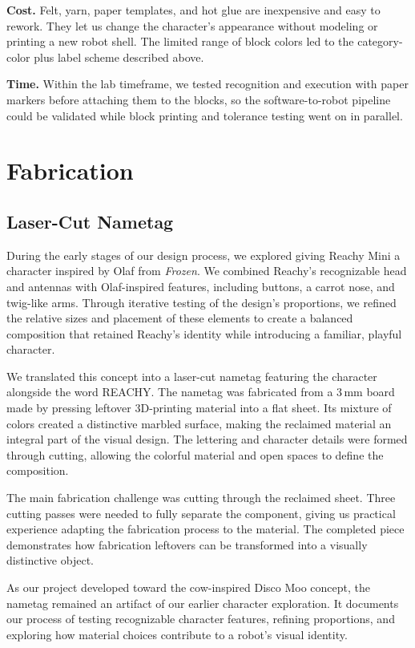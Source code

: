 \documentclass[conference]{IEEEtran}
\begin{document}
\textbf{Cost.} Felt, yarn, paper templates, and hot glue are inexpensive and easy to rework. They let us change the character's appearance without modeling or printing a new robot shell. The limited range of block colors led to the category-color plus label scheme described above.

\textbf{Time.} Within the lab timeframe, we tested recognition and execution with paper markers before attaching them to the blocks, so the software-to-robot pipeline could be validated while block printing and tolerance testing went on in parallel.



\section{Fabrication}
\label{sec:fabrication}

\subsection{Laser-Cut Nametag}

During the early stages of our design process, we explored giving Reachy Mini a character inspired by Olaf from \textit{Frozen}. We combined Reachy's recognizable head and antennas with Olaf-inspired features, including buttons, a carrot nose, and twig-like arms. Through iterative testing of the design's proportions, we refined the relative sizes and placement of these elements to create a balanced composition that retained Reachy's identity while introducing a familiar, playful character.

We translated this concept into a laser-cut nametag featuring the character alongside the word REACHY. The nametag was fabricated from a 3\,mm board made by pressing leftover 3D-printing material into a flat sheet. Its mixture of colors created a distinctive marbled surface, making the reclaimed material an integral part of the visual design. The lettering and character details were formed through cutting, allowing the colorful material and open spaces to define the composition.

The main fabrication challenge was cutting through the reclaimed sheet. Three cutting passes were needed to fully separate the component, giving us practical experience adapting the fabrication process to the material. The completed piece demonstrates how fabrication leftovers can be transformed into a visually distinctive object.

As our project developed toward the cow-inspired Disco Moo concept, the nametag remained an artifact of our earlier character exploration. It documents our process of testing recognizable character features, refining proportions, and exploring how material choices contribute to a robot's visual identity.
\end{document}
